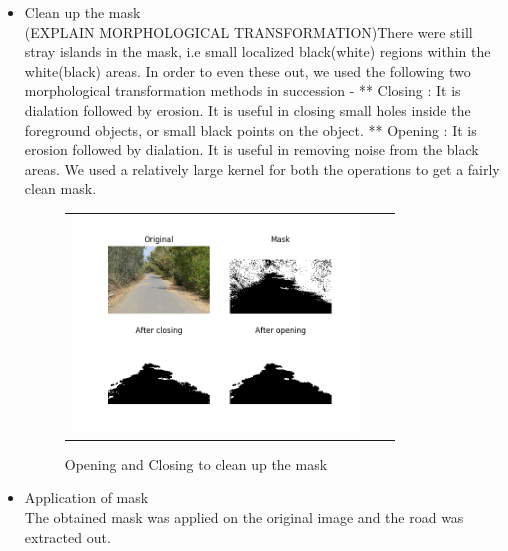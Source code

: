 \documentclass[12pt,a4paper]{article}
\begin{document}
\begin{itemize}
\begin{figure}[!ht]
\begin{center}
\end{center}
\end{figure}
    
\newpage
    
\item Clean up the mask \\
    (EXPLAIN MORPHOLOGICAL TRANSFORMATION)There were still stray islands in the mask, i.e small localized black(white) regions within the white(black) areas. In order to even these out, we used the following two morphological transformation methods in succession -
    ** Closing : It is dialation followed by erosion. It is useful in closing small holes inside the foreground objects, or small black points on the object.
    ** Opening : It is erosion followed by dialation. It is useful in removing noise from the black areas.
    We used a relatively large kernel for both the operations to get a fairly clean mask.
 

\begin{figure}[!ht]
\begin{center}

\begin{tabular}{ccc}
\centering
\includegraphics[width = 3in]{images/closing_opening.png}
\end{tabular}
\caption{Opening and Closing to clean up the mask}

\end{center}
\end{figure} 
    
\item Application of mask \\
    The obtained mask was applied on the original image and the road was extracted out. 

\begin{figure}[!ht]
\begin{center}


\end{center}
\end{figure}
\end{itemize}
\end{document}
